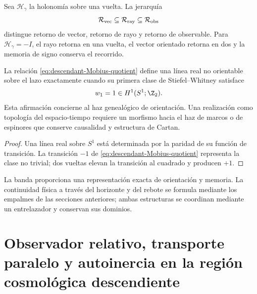 Sea \(\mathscr H_\gamma\) la holonom\'ia sobre una vuelta. La jerarqu\'ia
\begin{equation}
 \mathcal R_{\rm vec}
 \subseteq\mathcal R_{\rm ray}
 \subseteq\mathcal R_{\rm obs}
 \label{eq:descendant-return-hierarchy}
\end{equation}
distingue retorno de vector, retorno de rayo y retorno de observable. Para
\(\mathscr H_\gamma=-I\), el rayo retorna en una vuelta, el vector orientado
retorna en dos y la memoria de signo conserva el recorrido.

\begin{proposition}
\label{prop:descendant-Mobius-status}
La relaci\'on \cref{eq:descendant-Mobius-quotient} define una l\'inea real
no orientable sobre el lazo exactamente cuando su primera clase de
Stiefel--Whitney satisface
\begin{equation}
 w_1=1\in H^1(S^1;\Z_2).
 \label{eq:descendant-w1}
\end{equation}
Esta afirmaci\'on concierne al haz geneal\'ogico de orientaci\'on. Una
realizaci\'on como topolog\'ia del espacio-tiempo requiere un morfismo hacia
el haz de marcos o de espinores que conserve causalidad y estructura de
Cartan.
\end{proposition}

\begin{proof}
Una l\'inea real sobre \(S^1\) est\'a determinada por la paridad de su
funci\'on de transici\'on. La transici\'on \(-1\) de
\cref{eq:descendant-Mobius-quotient} representa la clase no trivial; dos
vueltas elevan la transici\'on al cuadrado y producen \(+1\).
\end{proof}

La banda proporciona una representaci\'on exacta de orientaci\'on y memoria.
La continuidad f\'isica a trav\'es del horizonte y del rebote se formula
mediante los empalmes de las secciones anteriores; ambas estructuras se
coordinan mediante un entrelazador y conservan sus dominios.

\section{Observador relativo, transporte paralelo y autoinercia en la región cosmológica descendiente}

